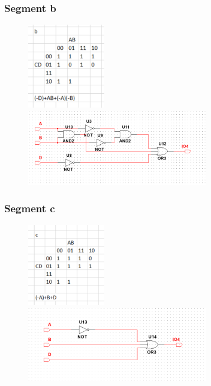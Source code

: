 \documentclass[12pt,a4paper]{article}
\begin{document}
\subsubsection{Segment b}
\begin{figure}[H]
\centering
\includegraphics[width=0.3\textwidth]{7seg/seg1}
\includegraphics[width=0.7\textwidth]{7seg/seg1circ}
\end{figure}

\subsubsection{Segment c}
\begin{figure}[H]
\centering
\includegraphics[width=0.3\textwidth]{7seg/seg2}
\includegraphics[width=0.7\textwidth]{7seg/seg2circ}
\end{figure}
\end{document}
